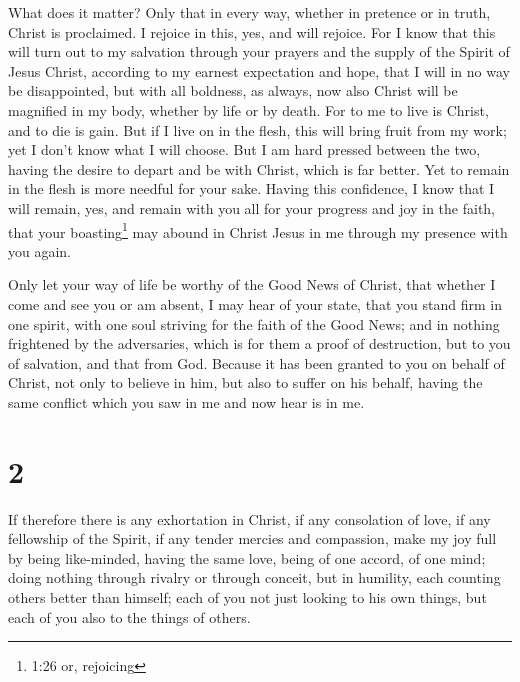  What does it matter? Only that in every way, whether in
pretence or in truth, Christ is proclaimed. I rejoice in this, yes, and
will rejoice.  For I know that this will turn out to my
salvation through your prayers and the supply of the Spirit of Jesus
Christ,  according to my earnest expectation and hope, that
I will in no way be disappointed, but with all boldness, as always, now
also Christ will be magnified in my body, whether by life or by death.
 For to me to live is Christ, and to die is gain.
 But if I live on in the flesh, this will bring fruit from
my work; yet I don't know what I will choose.  But I am
hard pressed between the two, having the desire to depart and be with
Christ, which is far better.  Yet to remain in the flesh is
more needful for your sake.  Having this confidence, I know
that I will remain, yes, and remain with you all for your progress and
joy in the faith,  that your boasting\footnote{1:26 or,
  rejoicing} may abound in Christ Jesus in me through my presence with
you again.

 Only let your way of life be worthy of the Good News of
Christ, that whether I come and see you or am absent, I may hear of your
state, that you stand firm in one spirit, with one soul striving for the
faith of the Good News;  and in nothing frightened by the
adversaries, which is for them a proof of destruction, but to you of
salvation, and that from God.  Because it has been granted
to you on behalf of Christ, not only to believe in him, but also to
suffer on his behalf,  having the same conflict which you
saw in me and now hear is in me.

\hypertarget{section-1}{%
\section{2}\label{section-1}}

 If therefore there is any exhortation in Christ, if any
consolation of love, if any fellowship of the Spirit, if any tender
mercies and compassion,  make my joy full by being
like-minded, having the same love, being of one accord, of one mind;
 doing nothing through rivalry or through conceit, but in
humility, each counting others better than himself;  each of
you not just looking to his own things, but each of you also to the
things of others.

